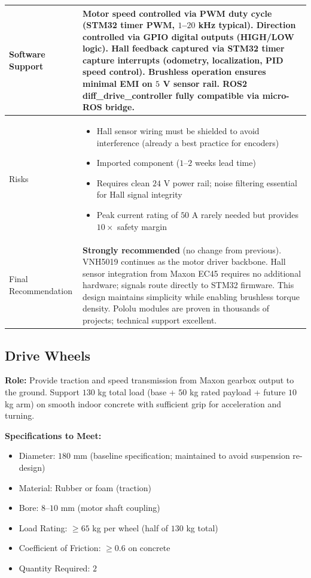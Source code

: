\documentclass[12pt,a4paper]{article}
\begin{document}
\begin{longtable}{|p{4cm}|p{10cm}|}
Software Support &
Motor speed controlled via PWM duty cycle (STM32 timer PWM, $1$--$20$ kHz typical). Direction controlled via GPIO digital outputs (HIGH/LOW logic). Hall feedback captured via STM32 timer capture interrupts (odometry, localization, PID speed control). Brushless operation ensures minimal EMI on $5$ V sensor rail. ROS2 diff\_drive\_controller fully compatible via micro-ROS bridge. \\
\hline

Risks &
\begin{itemize}
\item Hall sensor wiring must be shielded to avoid interference (already a best practice for encoders)
\item Imported component ($1$--$2$ weeks lead time)
\item Requires clean $24$ V power rail; noise filtering essential for Hall signal integrity
\item Peak current rating of $50$ A rarely needed but provides $10 \times$ safety margin
\end{itemize}
\\
\hline

Final Recommendation &
\textbf{Strongly recommended} (no change from previous). VNH5019 continues as the motor driver backbone. Hall sensor integration from Maxon EC45 requires no additional hardware; signals route directly to STM32 firmware. This design maintains simplicity while enabling brushless torque density. Pololu modules are proven in thousands of projects; technical support excellent. \\
\hline

\end{longtable}

\subsection{Drive Wheels}

\textbf{Role:} Provide traction and speed transmission from Maxon gearbox output to the ground. Support $130$ kg total load (base + $50$ kg rated payload + future $10$ kg arm) on smooth indoor concrete with sufficient grip for acceleration and turning.

\textbf{Specifications to Meet:}
\begin{itemize}
\item Diameter: $180$ mm (baseline specification; maintained to avoid suspension re-design)
\item Material: Rubber or foam (traction)
\item Bore: $8$--$10$ mm (motor shaft coupling)
\item Load Rating: $\geq 65$ kg per wheel (half of $130$ kg total)
\item Coefficient of Friction: $\geq 0.6$ on concrete
\item Quantity Required: $2$
\end{itemize}
\end{document}
